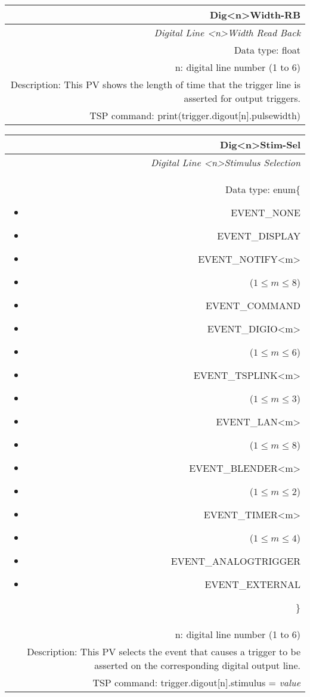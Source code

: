 \documentclass[openany]{article}
\begin{document}
		\begin{tabular}{N}
			\hline
			\bfseries Dig{\textless n\textgreater}Width-RB\label{pv:digwidth-rb} \\ \hline
			\emph{Digital Line \textless n\textgreater Width Read Back} \\
			Data type: float \\
			n: digital line number (1 to 6) \\
			Description: This PV shows the length of time that the trigger line is asserted for output triggers. \\
			TSP command: print(trigger.digout[n].pulsewidth)
		\end{tabular}

		\begin{tabular}{N}
			\hline
			\bfseries Dig{\textless n\textgreater}Stim-Sel\label{pv:digstim-sel} \\ \hline
			\emph{Digital Line \textless n\textgreater Stimulus Selection} \\
			Data type: enum\{\begin{itemize}[noitemsep]
				\small
				\item[] EVENT\_NONE
				\item[] EVENT\_DISPLAY
				\item[] EVENT\_NOTIFY\textless m\textgreater
				\item[] ($1\leq m\leq 8$)
				\item[] EVENT\_COMMAND
				\item[] EVENT\_DIGIO\textless m\textgreater
				\item[] ($1\leq m\leq 6$)
				\item[] EVENT\_TSPLINK\textless m\textgreater
				\item[] ($1\leq m\leq 3$)
				\item[] EVENT\_LAN\textless m\textgreater
				\item[] ($1\leq m\leq 8$)
				\item[] EVENT\_BLENDER\textless m\textgreater 
				\item[] ($1\leq m\leq 2$)
				\item[] EVENT\_TIMER\textless m\textgreater
				\item[] ($1\leq m\leq 4$)
				\item[] EVENT\_ANALOGTRIGGER
				\item[] EVENT\_EXTERNAL
			\end{itemize}\} \\
			n: digital line number (1 to 6) \\
			Description: This PV selects the event that causes a trigger to be asserted on the corresponding digital output line. \\
			TSP command: trigger.digout[n].stimulus = \emph{value}
		\end{tabular}
\end{document}
